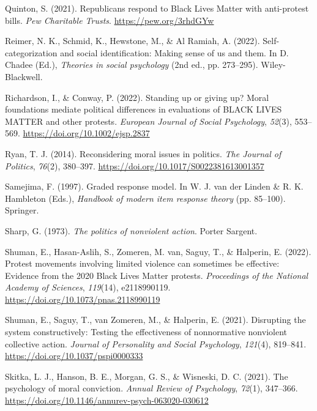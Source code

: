 \documentclass[twocolumn, 11pt, letterpaper]{article}
\newenvironment{CSLReferences}[2]{}{}
\begin{document}
\begin{CSLReferences}{1}{0}
\leavevmode{}%
Quinton, S. (2021). Republicans respond to {Black Lives Matter} with
anti-protest bills. \emph{Pew Charitable Trusts}.
\url{https://pew.org/3rhdGYw}

\leavevmode{}%
Reimer, N. K., Schmid, K., Hewstone, M., \& Al Ramiah, A. (2022).
Self-categorization and social identification: Making sense of us and
them. In D. Chadee (Ed.), \emph{Theories in social psychology} (2nd ed.,
pp. 273--295). Wiley-Blackwell.

\leavevmode{}%
Richardson, I., \& Conway, P. (2022). Standing up or giving up? {Moral}
foundations mediate political differences in evaluations of {BLACK}
{LIVES} {MATTER} and other protests. \emph{European Journal of Social
Psychology}, \emph{52}(3), 553--569.
\url{https://doi.org/10.1002/ejsp.2837}

\leavevmode{}%
Ryan, T. J. (2014). Reconsidering moral issues in politics. \emph{The
Journal of Politics}, \emph{76}(2), 380--397.
\url{https://doi.org/10.1017/S0022381613001357}

\leavevmode{}%
Samejima, F. (1997). Graded response model. In W. J. van der Linden \&
R. K. Hambleton (Eds.), \emph{Handbook of modern item response theory}
(pp. 85--100). Springer.

\leavevmode{}%
Sharp, G. (1973). \emph{The politics of nonviolent action}. Porter
Sargent.

\leavevmode{}%
Shuman, E., Hasan-Aslih, S., Zomeren, M. van, Saguy, T., \& Halperin, E.
(2022). Protest movements involving limited violence can sometimes be
effective: Evidence from the 2020 {Black Lives Matter} protests.
\emph{Proceedings of the National Academy of Sciences}, \emph{119}(14),
e2118990119. \url{https://doi.org/10.1073/pnas.2118990119}

\leavevmode{}%
Shuman, E., Saguy, T., van Zomeren, M., \& Halperin, E. (2021).
Disrupting the system constructively: {Testing} the effectiveness of
nonnormative nonviolent collective action. \emph{Journal of Personality
and Social Psychology}, \emph{121}(4), 819--841.
\url{https://doi.org/10.1037/pspi0000333}

\leavevmode{}%
Skitka, L. J., Hanson, B. E., Morgan, G. S., \& Wisneski, D. C. (2021).
The psychology of moral conviction. \emph{Annual Review of Psychology},
\emph{72}(1), 347--366.
\url{https://doi.org/10.1146/annurev-psych-063020-030612}


\end{CSLReferences}
\end{document}

